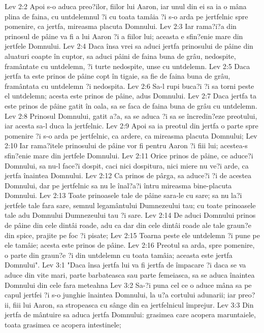 Lev 2:2  Apoi s-o aduca preo?ilor, fiilor lui Aaron, iar unul din ei sa ia o mâna plina de faina, cu untdelemnul ?i cu toata tamâia ?i s-o arda pe jertfelnic spre pomenire, ca jertfa, mireasma placuta Domnului.
Lev 2:3  Iar rama?i?a din prinosul de pâine va fi a lui Aaron ?i a fiilor lui; aceasta e sfin?enie mare din jertfele Domnului.
Lev 2:4  Daca însa vrei sa aduci jertfa prinosului de pâine din aluaturi coapte în cuptor, sa aduci pâini de faina buna de grâu, nedospite, framântate cu untdelemn, ?i turte nedospite, unse cu untdelemn.
Lev 2:5  Daca jertfa ta este prinos de pâine copt în tigaie, sa fie de faina buna de grâu, framântata cu untdelemn ?i nedospita.
Lev 2:6  Sa-l rupi buca?i ?i sa torni peste el untdelemn; acesta este prinos de pâine, adus Domnului.
Lev 2:7  Daca jertfa ta este prinos de pâine gatit în oala, sa se faca de faina buna de grâu cu untdelemn.
Lev 2:8  Prinosul Domnului, gatit a?a, sa se aduca ?i sa se încredin?eze preotului, iar acesta sa-l duca la jertfelnic.
Lev 2:9  Apoi sa ia preotul din jertfa o parte spre pomenire ?i s-o arda pe jertfelnic, ca ardere, ca mireasma placuta Domnului;
Lev 2:10  Iar rama?itele prinosului de pâine vor fi pentru Aaron ?i fiii lui; acestea-s sfin?enie mare din jertfele Domnului.
Lev 2:11  Orice prinos de pâine, ce aduce?i Domnului, sa nu-l face?i dospit, caci nici dospitura, nici miere nu ve?i arde, ca jertfa înaintea Domnului.
Lev 2:12  Ca prinos de pârga, sa aduce?i ?i de acestea Domnului, dar pe jertfelnic sa nu le înal?a?i întru mireasma bine-placuta Domnului.
Lev 2:13  Toate prinoasele tale de pâine sara-le cu sare; sa nu la?i jertfele tale fara sare, semnul legamântului Dumnezeului tau; cu toate prinoasele tale adu Domnului Dumnezeului tau ?i sare.
Lev 2:14  De aduci Domnului prinos de pâine din cele dintâi roade, adu ca dar din cele dintâi roade ale tale graun?e din spice, prajite pe foc ?i pisate;
Lev 2:15  Toarna peste ele untdelemn ?i pune pe ele tamâie; acesta este prinos de pâine.
Lev 2:16  Preotul sa arda, spre pomenire, o parte din graun?e ?i din untdelemn cu toata tamâia; aceasta este jertfa Domnului".
Lev 3:1  "Daca însa jertfa lui va fi jertfa de împacare ?i daca se va aduce din vite mari, parte barbateasca sau parte femeiasca, sa se aduca înaintea Domnului din cele fara meteahna
Lev 3:2  Sa-?i puna cel ce o aduce mâna sa pe capul jertfei ?i s-o junghie înaintea Domnului, la u?a cortului adunarii; iar preo?ii, fiii lui Aaron, sa stropeasca cu sânge din ea jertfelnicul împrejur.
Lev 3:3  Din jertfa de mântuire sa aduca jertfa Domnului: grasimea care acopera maruntaiele, toata grasimea ce acopera intestinele;
